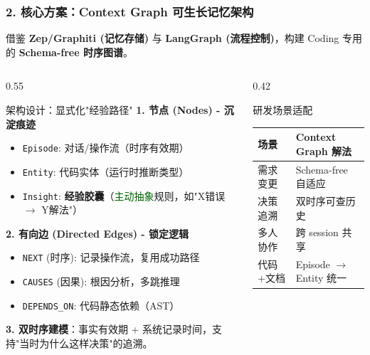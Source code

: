 \documentclass[aspectratio=169,10pt]{beamer}
\begin{document}
\begin{frame}
  \frametitle{2. 核心方案：Context Graph 可生长记忆架构}

  \begin{tcolorbox}[colback=layer1, title=\textbf{方案本质：为 LLM Agent 设计的工作记忆层}]
    \footnotesize
    借鉴 \textbf{Zep/Graphiti (记忆存储)} 与 \textbf{LangGraph (流程控制)}，构建 Coding 专用的 \textbf{Schema-free 时序图谱}。
  \end{tcolorbox}

  \vspace{0.1cm}

  \begin{columns}[T]
    \begin{column}{0.55\textwidth}
      \begin{block}{架构设计：显式化"经验路径"}
        \scriptsize
        \textbf{1. 节点 (Nodes) - 沉淀痕迹}
        \begin{itemize}
            \item \texttt{Episode}: 对话/操作流（时序有效期）
            \item \texttt{Entity}: 代码实体（运行时推断类型）
            \item \texttt{Insight}: \textbf{经验胶囊}（\textcolor{darkgreen}{主动抽象}规则，如"X错误 $\to$ Y解法"）
        \end{itemize}

        \vspace{0.05cm}

        \textbf{2. 有向边 (Directed Edges) - 锁定逻辑}
        \begin{itemize}
            \item \texttt{NEXT} (时序): 记录操作流，复用成功路径
            \item \texttt{CAUSES} (因果): 根因分析，多跳推理
            \item \texttt{DEPENDS\_ON}: 代码静态依赖（AST）
        \end{itemize}

        \vspace{0.05cm}
        \textbf{3. 双时序建模}：事实有效期 + 系统记录时间，支持"当时为什么这样决策"的追溯。
      \end{block}
    \end{column}

    \begin{column}{0.42\textwidth}
      \begin{block}{研发场景适配}
        \scriptsize
        \begin{tabular}{ll}
        \toprule
        \textbf{场景} & \textbf{Context Graph 解法} \\
        \midrule
        需求变更 & Schema-free 自适应 \\
        决策追溯 & 双时序可查历史 \\
        多人协作 & 跨 session 共享 \\
        代码+文档 & Episode $\to$ Entity 统一 \\
        \bottomrule
        \end{tabular}
      \end{block}


\end{column}
\end{columns}
\end{frame}
\end{document}
